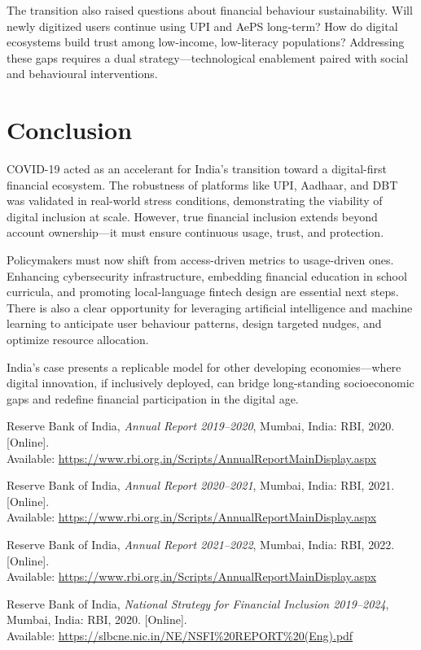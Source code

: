 \documentclass[conference]{IEEEtran}
\begin{document}
The transition also raised questions about financial behaviour sustainability. Will newly digitized users continue using UPI and AePS long-term? How do digital ecosystems build trust among low-income, low-literacy populations? Addressing these gaps requires a dual strategy—technological enablement paired with social and behavioural interventions.

\section{Conclusion}
COVID-19 acted as an accelerant for India’s transition toward a digital-first financial ecosystem. The robustness of platforms like UPI, Aadhaar, and DBT was validated in real-world stress conditions, demonstrating the viability of digital inclusion at scale. However, true financial inclusion extends beyond account ownership—it must ensure continuous usage, trust, and protection.

Policymakers must now shift from access-driven metrics to usage-driven ones. Enhancing cybersecurity infrastructure, embedding financial education in school curricula, and promoting local-language fintech design are essential next steps. There is also a clear opportunity for leveraging artificial intelligence and machine learning to anticipate user behaviour patterns, design targeted nudges, and optimize resource allocation.

India’s case presents a replicable model for other developing economies—where digital innovation, if inclusively deployed, can bridge long-standing socioeconomic gaps and redefine financial participation in the digital age.


\begin{thebibliography}{99}

    Reserve Bank of India, \textit{Annual Report 2019--2020}, Mumbai, India: RBI, 2020. [Online].\\
    Available: \url{https://www.rbi.org.in/Scripts/AnnualReportMainDisplay.aspx}

    Reserve Bank of India, \textit{Annual Report 2020--2021}, Mumbai, India: RBI, 2021. [Online].\\
    Available: \url{https://www.rbi.org.in/Scripts/AnnualReportMainDisplay.aspx}

    Reserve Bank of India, \textit{Annual Report 2021--2022}, Mumbai, India: RBI, 2022. [Online].\\
    Available: \url{https://www.rbi.org.in/Scripts/AnnualReportMainDisplay.aspx}

    Reserve Bank of India, \textit{National Strategy for Financial Inclusion 2019--2024}, Mumbai, India: RBI, 2020. [Online].\\
    Available: \url{https://slbcne.nic.in/NE/NSFI%20REPORT%20(Eng).pdf}

\end{thebibliography}
\end{document}
